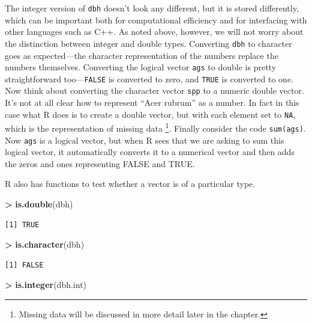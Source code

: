 \documentclass[]{krantz}
\makeatletter
\newenvironment{Shaded}{\begin{snugshade}}{\end{snugshade}}
\newcommand{\KeywordTok}[1]{\textcolor[rgb]{0.27,0.27,0.27}{\textbf{#1}}}
\newcommand{\StringTok}[1]{\textcolor[rgb]{0.5,0.5,0.5}{#1}}
\newcommand{\OperatorTok}[1]{\textcolor[rgb]{0.43,0.43,0.43}{\textbf{#1}}}
\newcommand{\NormalTok}[1]{#1}
\newenvironment{kframe}{%
\medskip{}
\setlength{\fboxsep}{.8em}
 \def\at@end@of@kframe{}%
 \ifinner\ifhmode%
  \def\at@end@of@kframe{\end{minipage}}%
  \begin{minipage}{\columnwidth}%
 \fi\fi%
 \def\FrameCommand##1{\hskip\@totalleftmargin \hskip-\fboxsep
 \colorbox{shadecolor}{##1}\hskip-\fboxsep
     \hskip-\linewidth \hskip-\@totalleftmargin \hskip\columnwidth}%
 \MakeFramed {\advance\hsize-\width
   \@totalleftmargin\z@ \linewidth\hsize
   \@setminipage}}%
 {\par\unskip\endMakeFramed%
 \at@end@of@kframe}
\renewenvironment{Shaded}{\begin{kframe}}{\end{kframe}}
\theoremstyle{definition}
\theoremstyle{definition}
\theoremstyle{definition}
\theoremstyle{remark}
\makeatother
\begin{document}
The integer version of \texttt{dbh} doesn't look any different, but it
is stored differently, which can be important both for computational
efficiency and for interfacing with other languages such as C++. As
noted above, however, we will not worry about the distinction between
integer and double types. Converting \texttt{dbh} to character goes as
expected---the character representation of the numbers replace the
numbers themselves. Converting the logical vector \texttt{ags} to double
is pretty straightforward too---\texttt{FALSE} is converted to zero, and
\texttt{TRUE} is converted to one. Now think about converting the
character vector \texttt{spp} to a numeric double vector. It's not at
all clear how to represent ``Acer rubrum'' as a number. In fact in this
case what R does is to create a double vector, but with each element set
to \texttt{NA}, which is the representation of missing data \footnote{Missing
  data will be discussed in more detail later in the chapter.}. Finally
consider the code \texttt{sum(ags)}. Now \texttt{ags} is a logical
vector, but when R sees that we are asking to sum this logical vector,
it automatically converts it to a numerical vector and then adds the
zeros and ones representing FALSE and TRUE.

R also has functions to test whether a vector is of a particular type.

\begin{Shaded}
\begin{Highlighting}[]
\OperatorTok{>}\StringTok{ }\KeywordTok{is.double}\NormalTok{(dbh)}
\end{Highlighting}
\end{Shaded}

\begin{verbatim}
[1] TRUE
\end{verbatim}

\begin{Shaded}
\begin{Highlighting}[]
\OperatorTok{>}\StringTok{ }\KeywordTok{is.character}\NormalTok{(dbh)}
\end{Highlighting}
\end{Shaded}

\begin{verbatim}
[1] FALSE
\end{verbatim}

\begin{Shaded}
\begin{Highlighting}[]
\OperatorTok{>}\StringTok{ }\KeywordTok{is.integer}\NormalTok{(dbh.int)}
\end{Highlighting}
\end{Shaded}
\end{document}
